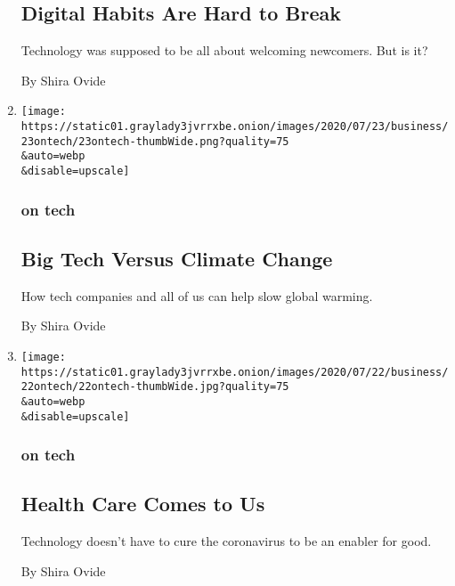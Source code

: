 \begin{enumerate}
  \hypertarget{digital-habits-are-hard-to-break}{%
  \subsection{Digital Habits Are Hard to
  Break}\label{digital-habits-are-hard-to-break}}

  Technology was supposed to be all about welcoming newcomers. But is
  it?

  By Shira Ovide
\item
  \href{/2020/07/23/technology/big-tech-climate-change.html}{}

  \texttt{[image: https://static01.graylady3jvrrxbe.onion/images/2020/07/23/business/23ontech/23ontech-thumbWide.png?quality=75\\\&auto=webp\\\&disable=upscale]}

  \hypertarget{on-tech-7}{%
  \subsubsection{on tech}\label{on-tech-7}}

  \hypertarget{big-tech-versus-climate-change}{%
  \subsection{Big Tech Versus Climate
  Change}\label{big-tech-versus-climate-change}}

  How tech companies and all of us can help slow global warming.

  By Shira Ovide
\item
  \href{/2020/07/22/technology/coronavirus-telemedicine.html}{}

  \texttt{[image: https://static01.graylady3jvrrxbe.onion/images/2020/07/22/business/22ontech/22ontech-thumbWide.jpg?quality=75\\\&auto=webp\\\&disable=upscale]}

  \hypertarget{on-tech-8}{%
  \subsubsection{on tech}\label{on-tech-8}}

  \hypertarget{health-care-comes-to-us}{%
  \subsection{Health Care Comes to Us}\label{health-care-comes-to-us}}

  Technology doesn't have to cure the coronavirus to be an enabler for
  good.

  By Shira Ovide
\end{enumerate}

